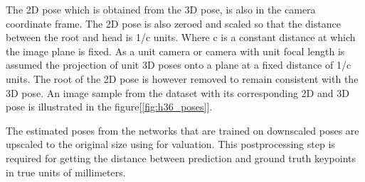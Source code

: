 The 2D pose which is obtained from the 3D pose, is also in the camera coordinate frame. The 2D pose is also zeroed and scaled so that the distance between the root and head is 1/c units. Where c is a constant distance at which the image plane is fixed. As a unit camera or camera with unit focal length is assumed the projection of unit 3D poses onto a plane at a fixed distance of 1/c units. The root of the 2D pose is however removed to remain consistent with the 3D pose. An image sample from the dataset with its corresponding 2D and 3D pose is illustrated in the figure[\ref{fig:h36_poses}].


The estimated poses from the networks that are trained on downscaled poses are upscaled to the original size using for valuation. This postprocessing step is required for getting the distance between prediction and ground truth keypoints in true units of millimeters.

